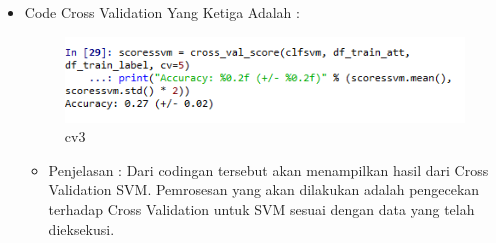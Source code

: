 \begin{enumerate}
\begin{itemize}
\begin{itemize}
\end{itemize}
\item Code Cross Validation Yang Ketiga Adalah :
\par
\begin{figure}[ht]
\centering
\includegraphics[scale=0.2]{figures/cv3.png}
\caption{cv3}
\label{contoh}
\end{figure}
\par
\begin{itemize}
\item Penjelasan : Dari codingan tersebut akan menampilkan hasil dari Cross Validation SVM. Pemrosesan yang akan dilakukan adalah pengecekan terhadap Cross Validation untuk SVM sesuai dengan data yang telah dieksekusi.
\par
\par
\end{itemize}
\end{itemize}


\end{enumerate}
